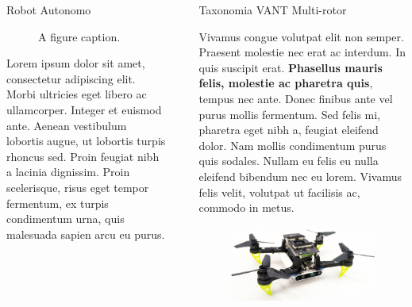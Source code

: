\documentclass[final]{beamer}
\newlength{\sepwidth}
\newlength{\colwidth}
\newcommand{\separatorcolumn}{\begin{column}{\sepwidth}\end{column}}
\begin{document}
\begin{frame}[t]
\begin{columns}[t]
\begin{column}{\colwidth}
\begin{block}{Robot Autonomo}
\begin{multicols}{2}
      \begin{figure}
      \centering
      \caption{A figure caption.}
    \end{figure}
    \end{multicols}
    Lorem ipsum dolor sit amet, consectetur adipiscing elit. Morbi ultricies
    eget libero ac ullamcorper. Integer et euismod ante. Aenean vestibulum
    lobortis augue, ut lobortis turpis rhoncus sed. Proin feugiat nibh a
    lacinia dignissim. Proin scelerisque, risus eget tempor fermentum, ex
    turpis condimentum urna, quis malesuada sapien arcu eu purus.

  \end{block}
\end{column}

\separatorcolumn

\begin{column}{\colwidth}
  
  \begin{block}{Taxonomia VANT Multi-rotor}

    Vivamus congue volutpat elit non semper. Praesent molestie nec erat ac
    interdum. In quis suscipit erat. \textbf{Phasellus mauris felis, molestie
    ac pharetra quis}, tempus nec ante. Donec finibus ante vel purus mollis
    fermentum. Sed felis mi, pharetra eget nibh a, feugiat eleifend dolor. Nam
    mollis condimentum purus quis sodales. Nullam eu felis eu nulla eleifend
    bibendum nec eu lorem. Vivamus felis velit, volutpat ut facilisis ac,
    commodo in metus.
    
    \begin{figure}[t]
      \includegraphics[width=38cm]{images/uav_planning_drone.jpg}
      \centering
    \end{figure}
    

\end{block}
\end{column}
\end{columns}
\end{frame}
\end{document}

